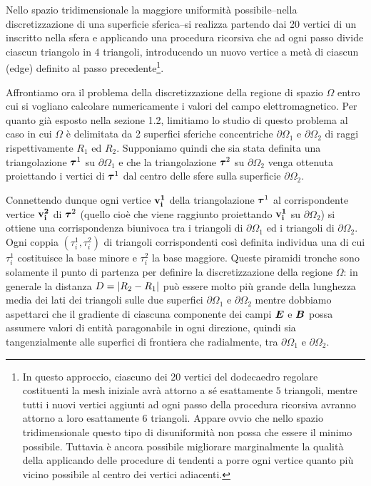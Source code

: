Nello spazio tridimensionale la maggiore uniformità possibile--nella discretizzazione di una superficie sferica--si realizza  partendo dai 20 vertici di un  inscritto nella sfera e applicando una procedura ricorsiva che ad ogni passo divide ciascun triangolo in $4$ triangoli, introducendo un nuovo vertice a metà di ciascun  (edge) definito al passo precedente\footnote{In questo approccio, ciascuno dei 20 vertici del dodecaedro regolare costituenti la mesh iniziale avrà attorno a sé esattamente $5$ triangoli, mentre tutti i nuovi vertici aggiunti ad ogni passo della procedura ricorsiva avranno attorno a loro esattamente $6$ triangoli. Appare ovvio che nello spazio tridimensionale questo tipo di disuniformità non possa che essere il minimo possibile. Tuttavia è ancora possibile migliorare marginalmente la qualità della  applicando delle procedure di  tendenti a porre ogni vertice quanto più vicino possibile al centro dei vertici adiacenti.}. 

Affrontiamo ora il problema della discretizzazione della regione di spazio $\Omega$ entro cui si vogliano calcolare numericamente i valori del campo elettromagnetico. Per quanto già esposto nella sezione 1.2, limitiamo lo studio di questo problema al caso in cui $\Omega$ è delimitata da 2 superfici sferiche concentriche $\partial \Omega_1$ e $\partial \Omega_2$ di raggi rispettivamente $R_1$ ed $R_2$. Supponiamo quindi che sia stata definita una triangolazione $\vb*{\tau}^1$ su $\partial \Omega_1$ e che la triangolazione $\vb*{\tau}^2$ su $\partial \Omega_2$ venga ottenuta proiettando i vertici di $\vb*{\tau}^1$ dal centro delle sfere sulla superficie $\partial \Omega_2$.  

Connettendo dunque ogni vertice $\vb{v^1_i}$ della triangolazione $\vb*{\tau}^1$ al corrispondente vertice $\vb{v^2_i}$ di $\vb*{\tau}^2$ (quello cioè che viene raggiunto proiettando $\vb{v^1_i}$ su $\partial \Omega_2$) si ottiene una corrispondenza biunivoca tra i triangoli di $\partial \Omega_1$ ed i triangoli di $\partial \Omega_2$. Ogni coppia $(\tau^1_i, \tau^2_i)$ di triangoli corrispondenti così definita individua una  di cui $\tau^1_i$ costituisce la base minore e $\tau^2_i$ la base maggiore. Queste piramidi tronche sono solamente il punto di partenza per definire la discretizzazione della regione $\Omega$: in generale la distanza $D = \abs{R_2 - R_1}$ può essere molto più grande della lunghezza media dei lati dei triangoli sulle due superfici $\partial \Omega_1$ e $\partial \Omega_2$ mentre dobbiamo aspettarci che il gradiente di ciascuna componente dei campi $\vb*{E}$ e $\vb*{B}$ possa assumere valori di entità paragonabile in ogni direzione, quindi sia tangenzialmente alle superfici di frontiera che radialmente, tra $\partial \Omega_1$ e $\partial \Omega_2$.    

